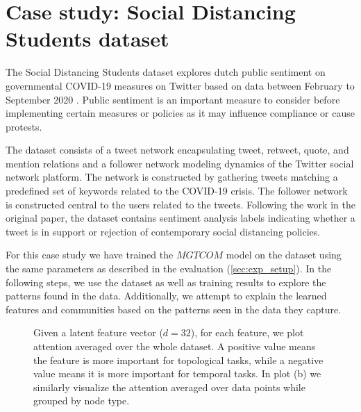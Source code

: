 \chapter{Case study: Social Distancing Students dataset} \label{sec:case_study}
The Social Distancing Students dataset explores dutch public sentiment on governmental COVID-19 measures on Twitter based on data between February to September 2020 \cite{wangPublicSentimentGovernmental2020}.
Public sentiment is an important measure to consider before implementing certain measures or policies as it may influence compliance or cause protests.

The dataset consists of a tweet network encapsulating tweet, retweet, quote, and mention relations and a follower network modeling dynamics of the Twitter social network platform.
The network is constructed by gathering tweets matching a predefined set of keywords related to the COVID-19 crisis.
The follower network is constructed central to the users related to the tweets.
Following the work in the original paper, the dataset contains sentiment analysis labels indicating whether a tweet is in support or rejection of contemporary social distancing policies.

For this case study we have trained the $MGTCOM$ model on the dataset using the same parameters as described in the evaluation (\cref{sec:exp_setup}).
In the following steps, we use the dataset as well as training results to explore the patterns found in the data.
Additionally, we attempt to explain the learned features and communities based on the patterns seen in the data they capture.

\begin{figure}[ht!]
\centering
{}\quad
{}\quad
\caption{
    Given a latent feature vector ($d = 32$), for each feature, we plot attention averaged over the whole dataset.
    A positive value means the feature is more important for topological tasks, while a negative value means it is more important for temporal tasks.
    In plot (b) we similarly visualize the attention averaged over data points while grouped by node type.
}
\label{fig:cs_att_ratio}
\end{figure}

